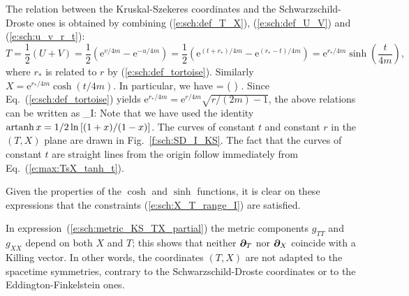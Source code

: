 The relation between the Kruskal-Szekeres coordinates and the
Schwarzschild-Droste ones is obtained by combining (\ref{e:sch:def_T_X}),
(\ref{e:sch:def_U_V}) and (\ref{e:sch:u_v_r_t}):
\[
    T = \frac{1}{2}(U+V) = \frac{1}{2} \left( \mathrm{e}^{v/4m}
        - \mathrm{e}^{-u/4m} \right) =
        \frac{1}{2} \left( \mathrm{e}^{(t+r_*)/4m}
        - \mathrm{e}^{(r_*-t)/4m} \right)
        = \mathrm{e}^{r_*/4m} \sinh\left( \frac{t}{4m} \right) ,
\]
where $r_*$ is related to $r$ by (\ref{e:sch:def_tortoise}).
Similarly $X = \mathrm{e}^{r_*/4m} \cosh(t/4m)$.
In particular, we have
\be \label{e:max:TsX_tanh_t}
     = \tanh\left(  \right) .
\ee
Since Eq.~(\ref{e:sch:def_tortoise}) yields
$\mathrm{e}^{r_*/4m} = \mathrm{e}^{r/4m} \sqrt{ r/(2m) - 1 }$,
the above relations can be written as
\be \label{e:sch:KS_SD_I}
    \M_{\rm I}: \quad {}
    \iff
\ee
Note that we have used the identity $\operatorname{artanh} x = 1/2 \ln\left[(1+x)/(1-x)\right]$.
The curves of constant $t$ and constant $r$ in the $(T,X)$ plane
are drawn in Fig.~\ref{f:sch:SD_I_KS}.
The fact that the curves of constant $t$ are straight lines from the
origin follow immediately
from Eq.~(\ref{e:max:TsX_tanh_t}).

\begin{remark}
Given the properties of the $\cosh$ and $\sinh$ functions, it is clear on these
expressions that the constraints (\ref{e:sch:X_T_range_I}) are satisfied.
\end{remark}
\begin{remark}
In expression~(\ref{e:sch:metric_KS_TX_partial})
the metric components $g_{TT}$ and $g_{XX}$ depend on both $X$ and $T$; this
shows that neither $\bm{\partial}_T$ nor $\bm{\partial}_X$ coincide with a Killing vector.
In other words, the coordinates $(T,X)$ are not adapted to the spacetime
symmetries, contrary to the Schwarzschild-Droste coordinates or to the
Eddington-Finkelstein ones.
\end{remark}

